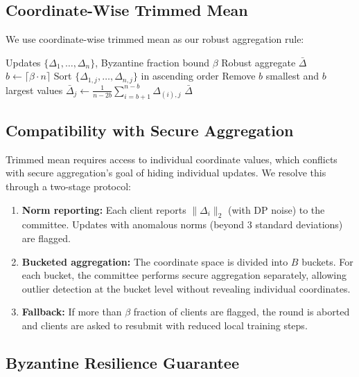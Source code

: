 \documentclass[11pt,a4paper]{article}
\begin{document}
\subsection{Coordinate-Wise Trimmed Mean}

We use coordinate-wise trimmed mean as our robust aggregation rule:

\begin{algorithm}[H]
\caption{Byzantine-Resilient Aggregation}
\label{alg:byzantine}
\begin{algorithmic}[1]
\Require Updates $\{\Delta_1, \ldots, \Delta_n\}$, Byzantine fraction bound $\beta$
\Ensure Robust aggregate $\bar{\Delta}$
\State $b \leftarrow \lceil \beta \cdot n \rceil$ 
    \State Sort $\{\Delta_{1,j}, \ldots, \Delta_{n,j}\}$ in ascending order
    \State Remove $b$ smallest and $b$ largest values
    \State $\bar{\Delta}_j \leftarrow \frac{1}{n - 2b} \sum_{i=b+1}^{n-b} \Delta_{(i),j}$
\EndFor
\State \Return $\bar{\Delta}$
\end{algorithmic}
\end{algorithm}

\subsection{Compatibility with Secure Aggregation}

Trimmed mean requires access to individual coordinate values, which conflicts with secure aggregation's goal of hiding individual updates. We resolve this through a two-stage protocol:

\begin{enumerate}
    \item \textbf{Norm reporting:} Each client reports $\|\Delta_i\|_2$ (with DP noise) to the committee. Updates with anomalous norms (beyond 3 standard deviations) are flagged.
    \item \textbf{Bucketed aggregation:} The coordinate space is divided into $B$ buckets. For each bucket, the committee performs secure aggregation separately, allowing outlier detection at the bucket level without revealing individual coordinates.
    \item \textbf{Fallback:} If more than $\beta$ fraction of clients are flagged, the round is aborted and clients are asked to resubmit with reduced local training steps.
\end{enumerate}

\subsection{Byzantine Resilience Guarantee}
\end{document}
